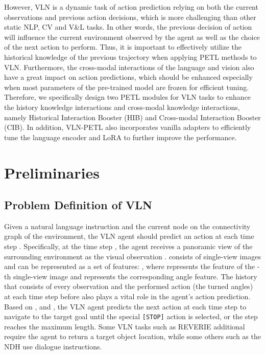 \documentclass[10pt,twocolumn,letterpaper]{article}
\begin{document}
However, VLN is a dynamic task of action prediction relying on both the current observations and previous action decisions, which is more challenging than other static NLP, CV and V\&L tasks. In other words, the previous decision of action will influence the current environment observed by the agent as well as the choice of the next action to perform. Thus, it is important to effectively utilize the historical knowledge of the previous trajectory when applying PETL methods to VLN. Furthermore, the cross-modal interactions of the language and vision also have a great impact on action predictions, which should be enhanced especially when most parameters of the pre-trained model are frozen for efficient tuning. Therefore, we specifically design two PETL modules for VLN tasks to enhance the history knowledge interactions and cross-modal knowledge interactions, namely Historical Interaction Booster (HIB) and Cross-modal Interaction Booster (CIB). In addition, VLN-PETL also incorporates vanilla adapters to efficiently tune the language encoder and LoRA to further improve the performance.






 \vspace{-5pt}
\section{Preliminaries}
\label{sec:methods}


\subsection{Problem Definition of VLN}
\vspace{-3pt}
Given a natural language instruction 
and the current node on the connectivity graph of the environment, the VLN agent should predict an action  at each time step .
Specifically, at the time step , the agent receives a panoramic view of the surrounding environment as the visual observation .  consists of  single-view images and can be represented as a set of features: 
, where  represents the feature of the -th single-view image and  represents the corresponding angle feature. The history  that consists of every observation  and the performed action  (\ie the turned angles) at each time step  before  also plays a vital role in the agent's action prediction.
Based on ,  and , the VLN agent predicts the next action  at each time step  to navigate to the target goal until the special \texttt{[STOP]} action is selected, or the step reaches the maximum length. Some VLN tasks such as REVERIE \cite{reverie} additional require the agent to return a target object location, while some others such as the NDH \cite{ndh} use dialogue instructions.
\end{document}

